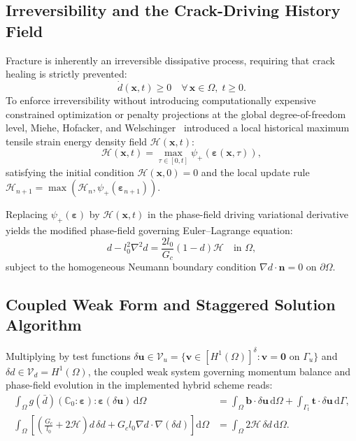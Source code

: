 \subsection{Irreversibility and the Crack-Driving History Field}
Fracture is inherently an irreversible dissipative process, requiring that crack healing is strictly prevented:
\begin{equation}
\label{eq:irreversibility_condition}
\dot{d}(\mathbf{x}, t) \ge 0 \quad \forall \, \mathbf{x} \in \Omega, \; t \ge 0.
\end{equation}
To enforce irreversibility without introducing computationally expensive constrained optimization or penalty projections at the global degree-of-freedom level, Miehe, Hofacker, and Welschinger~\cite{miehe2010b} introduced a local historical maximum tensile strain energy density field $\mathcal{H}(\mathbf{x}, t)$:
\begin{equation}
\label{eq:history_variable_def}
\mathcal{H}(\mathbf{x}, t) = \max_{\tau \in [0, t]} \psi_+(\boldsymbol{\varepsilon}(\mathbf{x}, \tau)),
\end{equation}
satisfying the initial condition $\mathcal{H}(\mathbf{x}, 0) = 0$ and the local update rule $\mathcal{H}_{n+1} = \max(\mathcal{H}_n, \psi_+(\boldsymbol{\varepsilon}_{n+1}))$.

Replacing $\psi_+(\boldsymbol{\varepsilon})$ by $\mathcal{H}(\mathbf{x}, t)$ in the phase-field driving variational derivative yields the modified phase-field governing Euler--Lagrange equation:
\begin{equation}
\label{eq:phase_field_pde}
d - l_0^2 \nabla^2 d = \frac{2 l_0}{G_c} (1 - d) \mathcal{H} \quad \text{in } \Omega,
\end{equation}
subject to the homogeneous Neumann boundary condition $\nabla d \cdot \mathbf{n} = 0$ on $\partial\Omega$.

\subsection{Coupled Weak Form and Staggered Solution Algorithm}
Multiplying by test functions $\delta\mathbf{u} \in \mathcal{V}_u = \{\mathbf{v} \in [H^1(\Omega)]^\delta : \mathbf{v} = \mathbf{0} \text{ on } \Gamma_u\}$ and $\delta d \in \mathcal{V}_d = H^1(\Omega)$, the coupled weak system governing momentum balance and phase-field evolution in the implemented hybrid scheme reads:
\begin{align}
\label{eq:weak_form_u}
\int_{\Omega} g(\bar{d}) (\mathbb{C}_0 : \boldsymbol{\varepsilon}) : \boldsymbol{\varepsilon}(\delta\mathbf{u}) \, \mathrm{d}\Omega &= \int_{\Omega} \mathbf{b} \cdot \delta\mathbf{u} \, \mathrm{d}\Omega + \int_{\Gamma_t} \mathbf{t} \cdot \delta\mathbf{u} \, \mathrm{d}\Gamma, \\
\label{eq:weak_form_d}
\int_{\Omega} \left[ \left( \frac{G_c}{l_0} + 2\mathcal{H} \right) d \, \delta d + G_c l_0 \nabla d \cdot \nabla(\delta d) \right] \mathrm{d}\Omega &= \int_{\Omega} 2\mathcal{H} \, \delta d \, \mathrm{d}\Omega.
\end{align}


